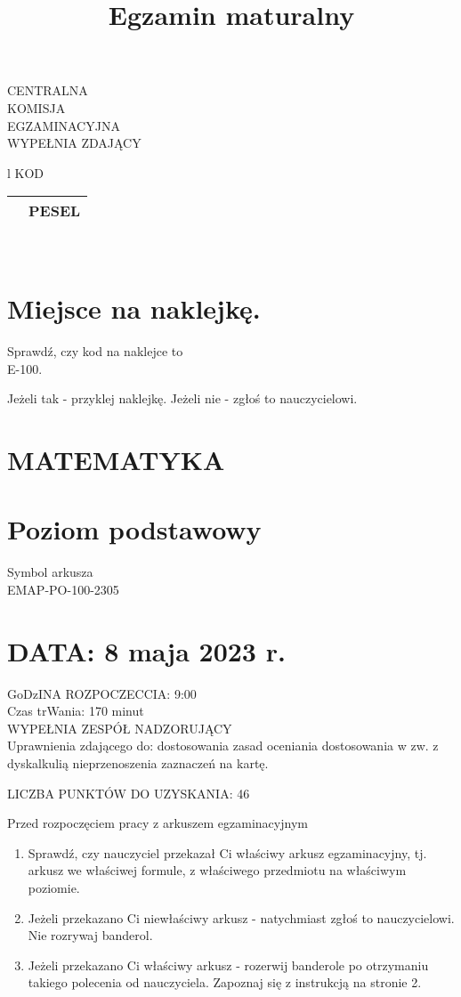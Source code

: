 \documentclass[10pt]{article}
\title{Egzamin maturalny }
\author{}
\date{}
\begin{document}
\maketitle
CENTRALNA\\
KOMISJA\\
EGZAMINACYJNA\\
WYPEŁNIA ZDAJĄCY

\begin{center}
\begin{tabular}{l}
KOD \\
\begin{tabular}{|l|l|}
\hline
 & PESEL \\
\hline
\end{tabular} \\
\hline
\end{tabular}
\end{center}

\section*{Miejsce na naklejkę.}
Sprawdź, czy kod na naklejce to\\
E-100.

Jeżeli tak - przyklej naklejkę. Jeżeli nie - zgłoś to nauczycielowi.

\section*{MATEMATYKA}
\section*{Poziom podstawowy}
Symbol arkusza\\
EMAP-PO-100-2305

\section*{DATA: 8 maja 2023 r.}
GoDzINA ROZPOCZECCIA: 9:00\\
Czas trWania: 170 minut\\
WYPEŁNIA ZESPÓŁ NADZORUJĄCY\\
Uprawnienia zdającego do: dostosowania zasad oceniania dostosowania w zw. z dyskalkulią nieprzenoszenia zaznaczeń na kartę.

LICZBA PUNKTÓW DO UZYSKANIA: 46

Przed rozpoczęciem pracy z arkuszem egzaminacyjnym

\begin{enumerate}
  \item Sprawdź, czy nauczyciel przekazał Ci właściwy arkusz egzaminacyjny, tj. arkusz we właściwej formule, z właściwego przedmiotu na właściwym poziomie.
  \item Jeżeli przekazano Ci niewłaściwy arkusz - natychmiast zgłoś to nauczycielowi. Nie rozrywaj banderol.
  \item Jeżeli przekazano Ci właściwy arkusz - rozerwij banderole po otrzymaniu takiego polecenia od nauczyciela. Zapoznaj się z instrukcją na stronie 2.
\end{enumerate}
\end{document}
